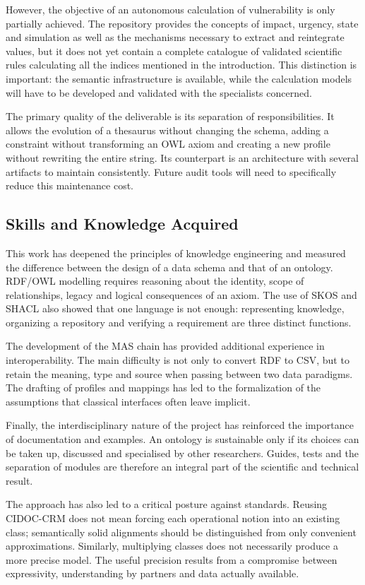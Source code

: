 \documentclass{article}
\begin{document}
However, the objective of an autonomous calculation of vulnerability is only partially achieved. The repository provides the concepts of impact, urgency, state and simulation as well as the mechanisms necessary to extract and reintegrate values, but it does not yet contain a complete catalogue of validated scientific rules calculating all the indices mentioned in the introduction. This distinction is important: the semantic infrastructure is available, while the calculation models will have to be developed and validated with the specialists concerned.

The primary quality of the deliverable is its separation of responsibilities. It allows the evolution of a thesaurus without changing the schema, adding a constraint without transforming an OWL axiom and creating a new profile without rewriting the entire string. Its counterpart is an architecture with several artifacts to maintain consistently. Future audit tools will need to specifically reduce this maintenance cost.

\subsection{Skills and Knowledge Acquired}

This work has deepened the principles of knowledge engineering and measured the difference between the design of a data schema and that of an ontology. RDF/OWL modelling requires reasoning about the identity, scope of relationships, legacy and logical consequences of an axiom. The use of SKOS and SHACL also showed that one language is not enough: representing knowledge, organizing a repository and verifying a requirement are three distinct functions.

The development of the MAS chain has provided additional experience in interoperability. The main difficulty is not only to convert RDF to CSV, but to retain the meaning, type and source when passing between two data paradigms. The drafting of profiles and mappings has led to the formalization of the assumptions that classical interfaces often leave implicit.

Finally, the interdisciplinary nature of the project has reinforced the importance of documentation and examples. An ontology is sustainable only if its choices can be taken up, discussed and specialised by other researchers. Guides, tests and the separation of modules are therefore an integral part of the scientific and technical result.

The approach has also led to a critical posture against standards. Reusing CIDOC-CRM does not mean forcing each operational notion into an existing class; semantically solid alignments should be distinguished from only convenient approximations. Similarly, multiplying classes does not necessarily produce a more precise model. The useful precision results from a compromise between expressivity, understanding by partners and data actually available.
\end{document}
